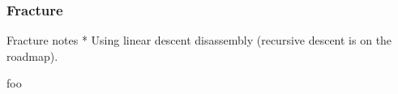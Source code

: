 
\subsubsection{Fracture}

Fracture notes
    * Using linear descent disassembly (recursive descent is on the roadmap).


foo
